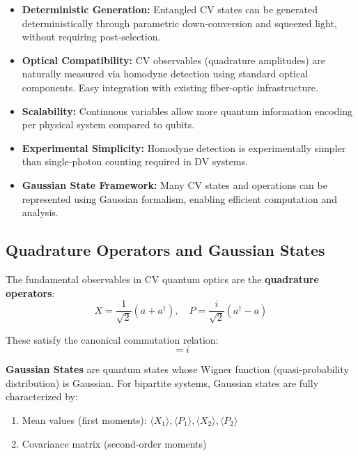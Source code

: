 \begin{itemize}
	\item \textbf{Deterministic Generation:} Entangled CV states can be generated deterministically through parametric down-conversion and squeezed light, without requiring post-selection.

	\item \textbf{Optical Compatibility:} CV observables (quadrature amplitudes) are naturally measured via homodyne detection using standard optical components. Easy integration with existing fiber-optic infrastructure.

	\item \textbf{Scalability:} Continuous variables allow more quantum information encoding per physical system compared to qubits.

	\item \textbf{Experimental Simplicity:} Homodyne detection is experimentally simpler than single-photon counting required in DV systems.

	\item \textbf{Gaussian State Framework:} Many CV states and operations can be represented using Gaussian formalism, enabling efficient computation and analysis.
\end{itemize}

\subsection{Quadrature Operators and Gaussian States}

The fundamental observables in CV quantum optics are the \textbf{quadrature operators}:
\begin{equation}
X = \frac{1}{\sqrt{2}}(a + a^\dagger), \quad P = \frac{i}{\sqrt{2}}(a^\dagger - a)
\end{equation}

These satisfy the canonical commutation relation:
\begin{equation}
[X, P] = i
\end{equation}

\textbf{Gaussian States} are quantum states whose Wigner function (quasi-probability distribution) is Gaussian. For bipartite systems, Gaussian states are fully characterized by:
\begin{enumerate}
	\item Mean values (first moments): $\langle X_1 \rangle, \langle P_1 \rangle, \langle X_2 \rangle, \langle P_2 \rangle$
	\item Covariance matrix (second-order moments)
\end{enumerate}

